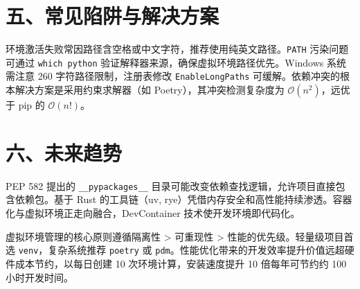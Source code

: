 \chapter{五、常见陷阱与解决方案}
环境激活失败常因路径含空格或中文字符，推荐使用纯英文路径。\verb!PATH! 污染问题可通过 \verb!which python! 验证解释器来源，确保虚拟环境路径优先。Windows 系统需注意 260 字符路径限制，注册表修改 \verb!EnableLongPaths! 可缓解。依赖冲突的根本解决方案是采用约束求解器（如 Poetry），其冲突检测复杂度为 $\mathcal{O}(n^2)$，远优于 pip 的 $\mathcal{O}(n!)$。\par
\chapter{六、未来趋势}
PEP 582 提出的 \verb!__pypackages__! 目录可能改变依赖查找逻辑，允许项目直接包含依赖包。基于 Rust 的工具链（uv, rye）凭借内存安全和高性能持续渗透。容器化与虚拟环境正走向融合，DevContainer 技术使开发环境即代码化。\par
虚拟环境管理的核心原则遵循隔离性 > 可重现性 > 性能的优先级。轻量级项目首选 \verb!venv!，复杂系统推荐 \verb!poetry! 或 \verb!pdm!。性能优化带来的开发效率提升价值远超硬件成本节约，以每日创建 10 次环境计算，安装速度提升 10 倍每年可节约约 100 小时开发时间。\par

